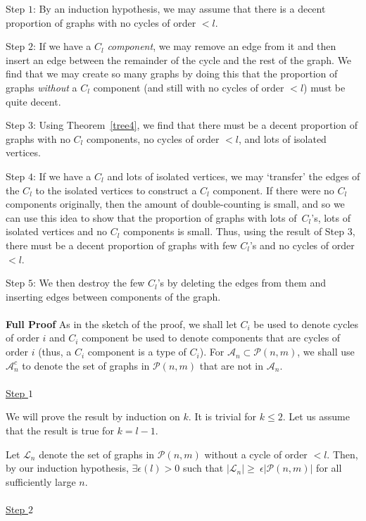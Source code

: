\documentclass{article}
\newtheorem{Proof of Theorem}{Proof of Theorem}
\begin{document}
Step $1$: 
By an induction hypothesis, 
we may assume that there is a decent proportion of graphs with no cycles of order $<l$.

Step $2$:
If we have a $C_{l}$ \textit{component},
we may remove an edge from it and then insert an edge
between the remainder of the cycle and the rest of the graph.
We find that we may create so many graphs by doing this
that the proportion of graphs \textit{without} a $C_{l}$ component (and still with no cycles of order $<l$)
must be quite decent.

Step $3$: 
Using Theorem~\ref{tree4},
we find that there must be a decent proportion of graphs 
with no $C_{l}$ components, no cycles of order $<l$, and lots of isolated vertices.

Step $4$:
If we have a $C_{l}$ and lots of isolated vertices,
we may `transfer' the edges of the $C_{l}$ to the isolated vertices to construct a $C_{l}$ component.
If there were no $C_{l}$ components originally,
then the amount of double-counting is small,
and so we can use this idea to show that the proportion of graphs 
with lots of~$C_{l}$'s, lots of isolated vertices and no $C_{l}$ components is small.
Thus, using the result of Step $3$,
there must be a decent proportion of graphs with few $C_{l}$'s and no cycles of order $<l$.

Step $5$:
We then destroy the few $C_{l}$'s by deleting the edges from them and inserting edges between components of the graph. \\
\\
\textbf{Full Proof}
As in the sketch of the proof,
we shall let $C_{i}$ be used to denote cycles of order $i$ 
and $C_{i}$ component be used to denote components that are cycles of order $i$
(thus, a $C_{i}$ component is a type of $C_{i}$). 
For $\mathcal{A}_{n} \subset \mathcal{P}(n,m)$,
we shall use $\mathcal{A}_{n}^{c}$ to denote the set of graphs in $\mathcal{P}(n,m)$ that are not in $\mathcal{A}_{n}$. \\ 
\\
\underline{Step $1$}

We will prove the result by induction on $k$.
It is trivial for $k \leq 2$.
Let us assume that the result is true for $k=l-1$.

Let $\mathcal{L}_{n}$ denote the set of graphs in $\mathcal{P}(n,m)$ without a cycle of order $<l$.
Then, by our induction hypothesis,
$\exists \epsilon (l) > 0$ such that
$|\mathcal{L}_{n}| \geq~\epsilon |\mathcal{P}(n,m)|$ for all sufficiently large $n$. \\
\\
\underline{Step $2$}
\end{document}
